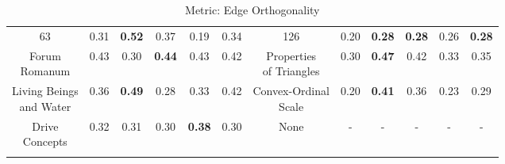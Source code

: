 \documentclass{article}
\begin{document}
{\begin{longtable}{cccccc@{\qquad}cccccc}
63 & 0.31 & \textbf{0.52} & 0.37 & 0.19 & 0.34 & 126 & 0.20 & \textbf{0.28} & \textbf{0.28} & 0.26 & \textbf{0.28} \\
\makecell[c]{Forum \\ Romanum} & 0.43 & 0.30 & \textbf{0.44} & 0.43 & 0.42 & \makecell[c]{Properties \\ of Triangles} & 0.30 & \textbf{0.47} & 0.42 & 0.33 & 0.35 \\
\makecell[c]{Living Beings \\ and Water} & 0.36 & \textbf{0.49} & 0.28 & 0.33 & 0.42 & \makecell[c]{Convex-Ordinal \\ Scale} & 0.20 & \textbf{0.41} & 0.36 & 0.23 & 0.29 \\
\makecell[c]{Drive \\ Concepts} & 0.32 & 0.31 & 0.30 & \textbf{0.38} & 0.30 & None & - & - & - & - & - \\
\caption{Metric: Edge Orthogonality} \\
\end{longtable}
}
\clearpage
\end{document}
